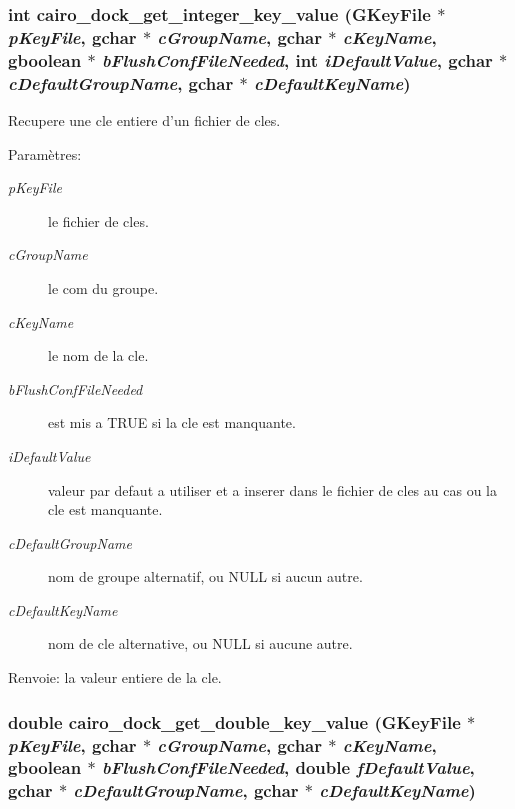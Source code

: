 \subsubsection{\setlength{\rightskip}{0pt plus 5cm}int cairo\_\-dock\_\-get\_\-integer\_\-key\_\-value (GKeyFile $\ast$ {\em pKeyFile}, gchar $\ast$ {\em cGroupName}, gchar $\ast$ {\em cKeyName}, gboolean $\ast$ {\em bFlushConfFileNeeded}, int {\em iDefaultValue}, gchar $\ast$ {\em cDefaultGroupName}, gchar $\ast$ {\em cDefaultKeyName})}\label{cairo-dock-config_8h_3f9539c7257b48c2e28371c565c2e076}


Recupere une cle entiere d'un fichier de cles. \begin{Desc}
\item[Paramètres:]
\begin{description}
\item[{\em pKeyFile}]le fichier de cles. \item[{\em cGroupName}]le com du groupe. \item[{\em cKeyName}]le nom de la cle. \item[{\em bFlushConfFileNeeded}]est mis a TRUE si la cle est manquante. \item[{\em iDefaultValue}]valeur par defaut a utiliser et a inserer dans le fichier de cles au cas ou la cle est manquante. \item[{\em cDefaultGroupName}]nom de groupe alternatif, ou NULL si aucun autre. \item[{\em cDefaultKeyName}]nom de cle alternative, ou NULL si aucune autre. \end{description}
\end{Desc}
\begin{Desc}
\item[Renvoie:]la valeur entiere de la cle. \end{Desc}
\subsubsection{\setlength{\rightskip}{0pt plus 5cm}double cairo\_\-dock\_\-get\_\-double\_\-key\_\-value (GKeyFile $\ast$ {\em pKeyFile}, gchar $\ast$ {\em cGroupName}, gchar $\ast$ {\em cKeyName}, gboolean $\ast$ {\em bFlushConfFileNeeded}, double {\em fDefaultValue}, gchar $\ast$ {\em cDefaultGroupName}, gchar $\ast$ {\em cDefaultKeyName})}\label{cairo-dock-config_8h_fe7e380a3c4f4e1e4272861db413482f}


